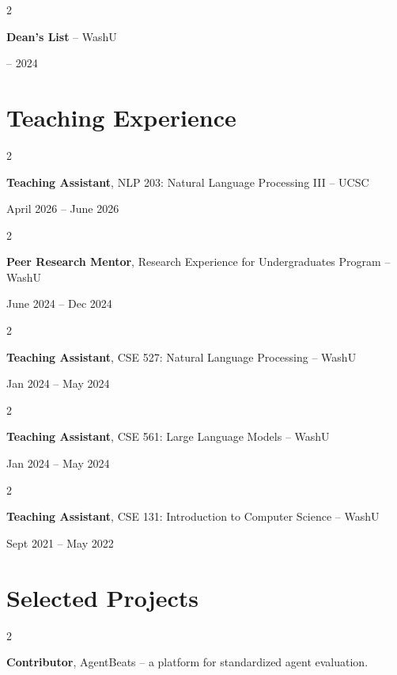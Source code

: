 \documentclass[10pt, letterpaper]{article}
\newenvironment{twocolentry}[2][]{
    \onecolentry
    \def\secondColumn{#2}
    \setcolumnwidth{\fill, 4.5 cm}
    \begin{paracol}{2}
}{
    \switchcolumn \raggedleft \secondColumn
    \end{paracol}
    \endonecolentry
} %
\begin{document}
        \begin{twocolentry}{2021 -- 2024}
            \textbf{Dean's List} -- WashU
        \end{twocolentry}


    \section{Teaching Experience}

        \begin{twocolentry}{April 2026 -- June 2026}
            \textbf{Teaching Assistant}, NLP 203: Natural Language Processing III -- UCSC
        \end{twocolentry}
        \vspace{0.10 cm}

        \begin{twocolentry}{June 2024 -- Dec 2024}
            \textbf{Peer Research Mentor}, Research Experience for Undergraduates Program -- WashU
        \end{twocolentry}
        \vspace{0.10 cm}

        \begin{twocolentry}{Jan 2024 -- May 2024}
            \textbf{Teaching Assistant}, CSE 527: Natural Language Processing -- WashU
        \end{twocolentry}
        \vspace{0.10 cm}

        \begin{twocolentry}{Jan 2024 -- May 2024}
            \textbf{Teaching Assistant}, CSE 561: Large Language Models -- WashU
        \end{twocolentry}
        \vspace{0.10 cm}

        \begin{twocolentry}{Sept 2021 -- May 2022}
            \textbf{Teaching Assistant}, CSE 131: Introduction to Computer Science -- WashU
        \end{twocolentry}

        
    \section{Selected Projects}

        \begin{twocolentry}{}
            \textbf{Contributor}, AgentBeats -- a platform for standardized agent evaluation.
        \end{twocolentry}
        
\end{document}

